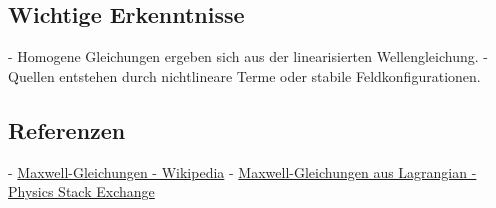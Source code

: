 \documentclass{article}
\begin{document}
	\subsection{Wichtige Erkenntnisse}
	- Homogene Gleichungen ergeben sich aus der linearisierten Wellengleichung.
	- Quellen entstehen durch nichtlineare Terme oder stabile Feldkonfigurationen.
	
	\subsection{Referenzen}
	- \href{https://en.wikipedia.org/wiki/Maxwell\%27s_equations}{Maxwell-Gleichungen - Wikipedia}
	- \href{https://physics.stackexchange.com/questions/3005/derivation-of-maxwells-equations-from-field-tensor-lagrangian}{Maxwell-Gleichungen aus Lagrangian - Physics Stack Exchange}
	
\end{document}
